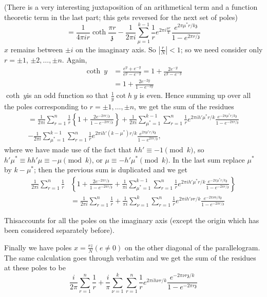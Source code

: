 (There is a very interesting juxtaposition of an arithmetical term and
a function theoretic term in the last part; this gets reversed for the
next set of poles)
$$
= \frac{1}{4 \pi i r} \coth \frac{\pi r}{\mathfrak{z}} - \frac{1}{2
  \pi i} \sum^{k-1}_{\mu=1} \frac{1}{r} e^{2 \pi i \frac{\mu r}{k}}
\frac{e^{2 \pi \mu^* r/k\mathfrak{z}}}{1-e^{2 \pi r/\mathfrak{z}}}
$$
$x$ remains between $\pm i$ on the imaginary axis. So $\left|
\frac{r}{N}\right|< 1$; so we need consider only $r= \pm 1$, $\pm 2,
\ldots, \pm n$. Again,
\begin{align*}
  \coth ~y & = \frac{e^y+ e^{-y}}{e^y - e^{-y}} = 1 +
  \frac{2e^{-y}}{e^y - e^{-y}}\\
  & = 1+ \frac{2 e^{-2y}}{1-e^{-2y}}
\end{align*}
$\coth~ y$\pageoriginale is an odd function so that $\frac{1}{y}\cot
h ~y$ is even. Hence summing up over all the poles corresponding to
$r= \pm 1, \ldots, \pm n$, we get the sum of the residues
\begin{multline*}
  = \frac{1}{2 \pi i} \sum^{n}_{r=1} \frac{1}{r} \left\{1 + \frac{2
    e^{-2 \pi r/\mathfrak{z}}}{1- e^{- 2 \pi r/\mathfrak{z}}}
  \right\}+ \frac{1}{2 \pi i} \sum^{k-1}_{\mu^* =1} \sum^n_{r=1}
  \frac{1}{r} e^{2 \pi i h' \mu^* r/k} \frac{e^{-2 \pi \mu^*
      r/k\mathfrak{z}}}{1- e^{-2 \pi r/\mathfrak{z}}}\\
  - \frac{1}{2 \pi i} \sum^{k-1}_{\mu^* =1} \sum^n_{r=1} \frac{1}{r}
  e^{2 \pi i h' (k-\mu^*) r/k} \frac{e^{2 \pi \mu^*
      r/k\mathfrak{z}}}{1- e^{2 \pi r/\mathfrak{z}}},
\end{multline*}
where we have made use of the fact that $hh'\equiv -1 \pmod{k}$, so
$h' \mu^* \equiv hh' \mu\equiv - \mu \pmod{k}$, or $\mu \equiv - h'
\mu^* \pmod{k}$. In the last sum replace $\mu^*$ by $k- \mu^*$; then
the previous sum is duplicated and we get
\begin{align*}
  \frac{1}{2 \pi i} \sum^n_{r=1} \frac{1}{r} & \left\{1+ \frac{2 e^{-2
      \pi r/\mathfrak{z}}}{1- e^{-2 \pi r/\mathfrak{z}}}+ \frac{1}{\pi
    i} \sum^{k-1}_{\mu^*=1} \sum^n_{r=1} \frac{1}{r} e^{2 \pi i h'
    \mu^* r/k} \frac{e^{- 2 \pi \mu^* r/k\mathfrak{z}}}{1- e^{-2 \pi
      r/\mathfrak{z}}} \right\}\\
  & = \frac{1}{2 \pi i} \sum^n_{r=1} \frac{1}{r} + \frac{1}{\pi i}
  \sum^k_{\nu=1} \sum^n_{r=1} \frac{1}{r} e^{2 \pi i h' \nu r/k}
  \frac{e^{- 2 \pi \nu n/k\mathfrak{z}}}{1- e^{-2 \pi r/\mathfrak{z}}}
\end{align*}

This\pageoriginale accounts for all the poles on the imaginary axis
(except the origin which has been considered separately before).

Finally we have poles $x= \frac{rz}{N} (e \neq 0)$ on the other
diagonal of the parallelogram. The same calculation goes through
verbatim and we get the sum of the residues at these poles to be 
$$
\frac{i}{2 \pi} \sum^n_{r=1} \frac{1}{r} + \frac{i}{\pi}
\sum^k_{\nu=1} \sum^n_{r=1} \frac{1}{r} e^{2 \pi i h \nu r/k}
\frac{e^{-2 \pi \nu r \mathfrak{z}/k}}{1- e^{- 2 \pi r \mathfrak{z}}}
$$
